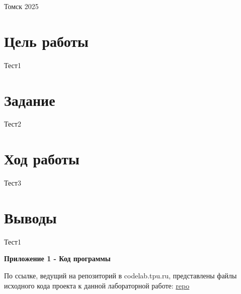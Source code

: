 \documentclass[a4paper,12pt]{article}
\begin{document}
\vspace{4.4cm}

\begin{center}
    Томск 2025
\end{center}

\newpage
\pagestyle{fancy}
\fancyhf{}
\fancyfoot[R]{\thepage}

\section*{Цель работы}
Тест1

\section*{Задание}
Тест2

\section*{Ход работы}
Тест3

\newpage

\section*{Выводы}
Тест1

\newpage

\begin{flushright}
\textbf{Приложение 1 - Код программы}
\end{flushright}
По ссылке, ведущий на репозиторий в codelab.tpu.ru, представлены файлы исходного кода проекта к данной лабораторной работе: \href{repo}{repo}
\end{document}
